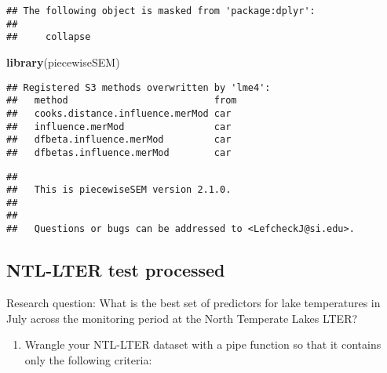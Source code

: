 \documentclass[]{article}
\newenvironment{Shaded}{\begin{snugshade}}{\end{snugshade}}
\newcommand{\CommentTok}[1]{\textcolor[rgb]{0.56,0.35,0.01}{\textit{#1}}}
\newcommand{\KeywordTok}[1]{\textcolor[rgb]{0.13,0.29,0.53}{\textbf{#1}}}
\newcommand{\NormalTok}[1]{#1}
\newcommand{\StringTok}[1]{\textcolor[rgb]{0.31,0.60,0.02}{#1}}
\providecommand{\tightlist}{%
  \setlength{\itemsep}{0pt}\setlength{\parskip}{0pt}}
\begin{document}
\begin{verbatim}
## The following object is masked from 'package:dplyr':
## 
##     collapse
\end{verbatim}

\begin{Shaded}
\begin{Highlighting}[]
\KeywordTok{library}\NormalTok{(piecewiseSEM)}
\end{Highlighting}
\end{Shaded}

\begin{verbatim}
## Registered S3 methods overwritten by 'lme4':
##   method                          from
##   cooks.distance.influence.merMod car 
##   influence.merMod                car 
##   dfbeta.influence.merMod         car 
##   dfbetas.influence.merMod        car
\end{verbatim}

\begin{verbatim}
## 
##   This is piecewiseSEM version 2.1.0.
## 
## 
##   Questions or bugs can be addressed to <LefcheckJ@si.edu>.
\end{verbatim}

\begin{Shaded}
\end{Shaded}

\hypertarget{ntl-lter-test-processed}{%
\subsection{NTL-LTER test processed}\label{ntl-lter-test-processed}}

Research question: What is the best set of predictors for lake
temperatures in July across the monitoring period at the North Temperate
Lakes LTER?

\begin{enumerate}
\def\labelenumi{\arabic{enumi}.}
\setcounter{enumi}{2}
\tightlist
\item
  Wrangle your NTL-LTER dataset with a pipe function so that it contains
  only the following criteria:
\end{enumerate}
\end{document}
